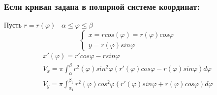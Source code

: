 \documentclass[12pt]{article}
\begin{document}
    \subsubsection*{Если кривая задана в полярной системе координат:}
    Пусть $r=r(\varphi) \;\;\; \alpha \leq \varphi \leq \beta$
    \[ \begin{cases}
        x=rcos(\varphi)=r(\varphi)cos\varphi\\
        y=r(\varphi)sin\varphi
    \end{cases} \]
    \begin{gather*}
        x'(\varphi)=r'cos\varphi-rsin\varphi\\
        \boxed{V_x=\pi \int_{\alpha}^{\beta} r^2(\varphi)sin^2\varphi (r'(\varphi)cos \varphi -r(\varphi)sin\varphi)d\varphi}\\
        \boxed{V_y=\pi \int_{\alpha_1}^{\beta_1}r^2(\varphi)cos^2\varphi(r'(\varphi)sin\varphi + r(\varphi)cos\varphi)d\varphi}
    \end{gather*}
\end{document}
